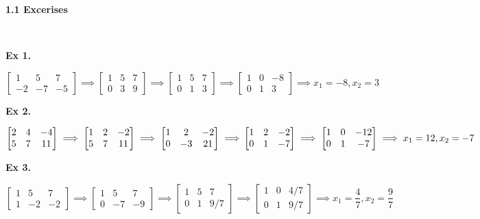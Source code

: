 \documentclass{article}
\date{}
\author{}
\begin{document}
\centerline{\textbf{1.1 Excerises}}
$ $\newline

\textbf{Ex 1.}

$
\begin{bmatrix}
1 &5 &7\\
-2 &-7 &-5
\end{bmatrix}
\implies
\begin{bmatrix}
1 &5 &7\\
0 &3 &9
\end{bmatrix}
\implies
\begin{bmatrix}
1 &5 &7\\
0 &1 &3
\end{bmatrix}
\implies
\begin{bmatrix}
1 &0 &-8\\
0 &1 &3
\end{bmatrix}
\implies x_1=-8, x_2=3
$

\textbf{Ex 2.}

$
\begin{bmatrix}
2 &4 &-4\\
5 &7 &11
\end{bmatrix}
\implies
\begin{bmatrix}
1 &2 &-2\\
5 &7 &11
\end{bmatrix}
\implies
\begin{bmatrix}
1 &2 &-2\\
0 &-3 &21
\end{bmatrix}
\implies\\
\begin{bmatrix}
1 &2 &-2\\
0 &1 &-7
\end{bmatrix}
\implies
\begin{bmatrix}
1 &0 &-12\\
0 &1 &-7
\end{bmatrix}
\implies
x_1=12, x_2=-7
$

\textbf{Ex 3.}

$
\begin{bmatrix}
1 &5 &7\\
1 &-2 &-2
\end{bmatrix}
\implies
\begin{bmatrix}
1 &5 &7\\
0 &-7 &-9
\end{bmatrix}
\implies
\begin{bmatrix}
1 &5 &7\\
0 &1 &9/7
\end{bmatrix}
\implies
\begin{bmatrix}
1 &0 &4/7\\
0 &1 &9/7
\end{bmatrix}
\implies x_1=\dfrac{4}{7}, x_2=\dfrac{9}{7}
$
\end{document}
